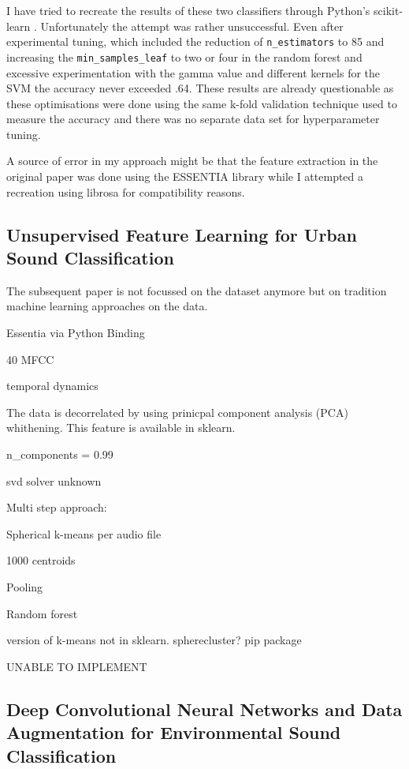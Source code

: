 I have tried to recreate the results of these two classifiers through Python's scikit-learn \cite{scikit-learn}. Unfortunately the attempt was rather unsuccessful. Even after experimental tuning, which included the reduction of \texttt{n_estimators} to 85 and increasing the \texttt{min_samples_leaf} to two or four in the random forest and excessive experimentation with the gamma value and different kernels for the SVM the accuracy never exceeded .64. These results are already questionable as these optimisations were done using the same k-fold validation technique used to measure the accuracy and there was no separate data set for hyperparameter tuning.
 
A source of error in my approach might be that the feature extraction in the original paper was done using the ESSENTIA library \cite{bogdanov:Essentia:ACMMULTIMEDIA13} while I attempted a recreation using librosa for compatibility reasons. 

\subsection{Unsupervised Feature Learning for Urban Sound Classification}
\label{7177954}

The subsequent paper \cite{7177954} is not focussed on the dataset anymore but on tradition machine learning approaches on the data. 

Essentia via Python Binding

40 MFCC

temporal dynamics

The data is decorrelated by using prinicpal component analysis (PCA) whithening. This feature is available in sklearn.

n_components = 0.99

svd solver unknown



Multi step approach:

Spherical k-means per audio file

1000 centroids

Pooling

Random forest



version of k-means not in sklearn. spherecluster? pip package

UNABLE TO IMPLEMENT


\newpage


\subsection{Deep Convolutional Neural Networks and Data
Augmentation for Environmental Sound
Classification}

